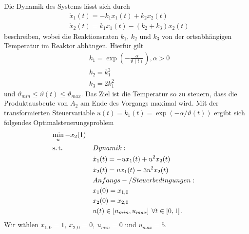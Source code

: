 Die Dynamik des Systems lässt sich durch
\begin{align}
	&\dot{x}_1(t) = -k_1x_1(t)+k_2x_2(t)\\
	&\dot{x}_2(t)= k_1x_1(t)-(k_2+k_3)x_2(t)
\end{align}
beschreiben, wobei die Reaktionsraten $k_1$, $k_2$ und $k_3$ von der ortsabhängigen Temperatur im Reaktor abhängen. Hierfür gilt
\begin{align}
	&k_1 = \exp\left(-\frac{\alpha}{\vartheta(t)}\right), \alpha > 0 \label{eq:k1} \\ 
	&k_2 = k_1^2\\
	&k_3 = 2k_1^2
\end{align}
und $\vartheta_{min} \leq \vartheta(t) \leq \vartheta_{max}$. Das Ziel ist die Temperatur so zu steuern, dass die Produktausbeute von $A_2$ am
Ende des Vorgangs maximal wird. Mit der transformierten Steuervariable $u(t) = k_1(t) = \exp\left(-\alpha/\vartheta(t)\right)$ ergibt sich folgendes Optimalsteuerungsproblem
\begin{align}
	&\min_u -x_2(1)\\\nonumber
	&\operatorname{s.t.} &&Dynamik:\\\nonumber
	&&&\dot{x}_1(t) = -ux_1(t)+u^2x_2(t)\\\nonumber
	&&&\dot{x}_2(t) = ux_1(t) - 3u^2x_2(t)\\\nonumber
	&&&Anfangs-/ Steuerbedingungen:\\\nonumber
	&&&x_1(0) = x_{1,0}\\\nonumber
	&&&x_2(0) = x_{2,0}\\\nonumber
	&&&u(t) \in \left[u_{min}, u_{max}\right] \: \forall t \in \left[0,1\right].\nonumber
\end{align}
Wir wählen $x_{1,0} = 1, \: x_{2,0} = 0, \:  u_{min} = 0$ und $u_{max} = 5$.